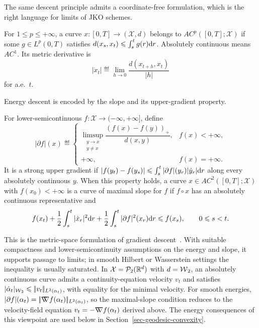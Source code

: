 The same descent principle admits a coordinate-free formulation, which is the right language for limits of JKO schemes.
\begin{defn}\label{def-metric-derivative-ac-curve}
For \(1\leq p\leq+\infty\), a curve $x:[0,T]\to(\mathcal X,d)$ belongs to \(AC^p([0,T];\mathcal X)\) if some $g\in L^p(0,T)$ satisfies $d(x_s,x_t)\leqslant\int_s^t g(r)\mathrm{d} r$. Absolutely continuous means \(AC^1\). Its metric derivative is
		\[
		|\dot x_t|
		\eqdef
			\lim_{h\to 0}\frac{d(x_{t+h},x_t)}{|h|}
		\]
for a.e.\ $t$.
\end{defn}

Energy descent is encoded by the slope and its upper-gradient property.
\begin{defn}\label{def-curve-maximal-slope}
For lower-semicontinuous $f:\mathcal X\to(-\infty,+\infty]$, define
		\[
		|\partial f|(x)
		\eqdef
		\begin{cases}
		\limsup_{\substack{y\to x\\ y\neq x}}
			\dfrac{( f(x)-f(y) )_+}{d(x,y)}, & f(x)<+\infty,\\[.4em]
		+\infty, & f(x)=+\infty.
		\end{cases}
		\]
It is a strong upper gradient if $|f(y_t)-f(y_s)|\leqslant \int_s^t |\partial f|(y_r)|\dot y_r|\mathrm{d} r$ along every absolutely continuous $y$. When this property holds, a curve $x\in AC^2([0,T];\mathcal X)$ with $f(x_0)<+\infty$ is a curve of maximal slope for $f$ if $f\circ x$ has an absolutely continuous representative and
	\[
		f(x_t)
		+\frac12\int_s^t |\dot x_r|^2\mathrm{d} r
		+\frac12\int_s^t |\partial f|^2(x_r)\mathrm{d} r
		\leqslant f(x_s),
			\qquad 0\leqslant s<t.
		\]
\end{defn}
This is the metric-space formulation of gradient descent~\cite{ambrosio2006gradient}. With suitable compactness and lower-semicontinuity assumptions on the energy and slope, it supports passage to limits; in smooth Hilbert or Wasserstein settings the inequality is usually saturated. In $\mathcal X=\mathcal{P}_2(\mathbb{R}^d)$ with $d=\operatorname{\mathcal{W}}_2$, an absolutely continuous curve admits a continuity-equation velocity $v_t$ and satisfies $|\dot\alpha_t|_{\operatorname{\mathcal{W}}_2}\leqslant|\!| v_t |\!|_{L^2(\alpha_t)}$, with equality for the minimal velocity. For smooth energies, $|\partial f|(\alpha_t)=|\!| \mathord{\nabla\mkern-9.3mu\nabla} f(\alpha_t) |\!|_{L^2(\alpha_t)}$, so the maximal-slope condition reduces to the velocity-field equation $v_t=-\mathord{\nabla\mkern-9.3mu\nabla} f(\alpha_t)$ derived above. The energy consequences of this viewpoint are used below in Section~\ref{sec-geodesic-convexity}.

